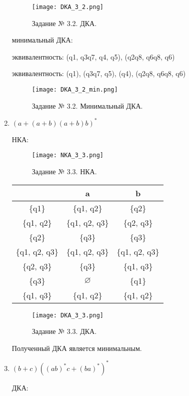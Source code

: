 \documentclass[a4paper, 12pt]{article}
\begin{document}
\begin{enumerate}
\begin{figure}[h!]
\centering
\texttt{[image: DKA\_3\_2.png]}
\caption{Задание № 3.2. ДКА.}
\end{figure}

 минимальный ДКА:

 эквивалентность: (q1, q3q7, q4, q5), (q2q8, q6q8, q6)

 эквивалентность: (q1), (q3q7, q5), (q4), (q2q8, q6q8, q6)

\begin{figure}[h!]
\centering
\texttt{[image: DKA\_3\_2\_min.png]}
\caption{Задание № 3.2. Минимальный ДКА.}
\end{figure}

\item $ (a+(a+b)(a+b)b)^* $ 

 НКА:

\begin{figure}[h!]
\centering
\texttt{[image: NKA\_3\_3.png]}
\caption{Задание № 3.3. НКА.}
\end{figure}

\begin{center}
\begin{tabular}{ |c|c|c| } 
\hline
\, & a & b \\
\hline
 \{q1\} & \{q1, q2\} & \{q2\} \\
\hline
 \{q1, q2\} & \{q1, q2, q3\} & \{q2, q3\} \\
\hline
 \{q2\} & \{q3\} & \{q3\} \\
\hline
 \{q1, q2, q3\} & \{q1, q2, q3\} & \{q1, q2, q3\} \\
\hline
 \{q2, q3\} & \{q3\} & \{q1, q3\} \\
\hline
 \{q3\} & $\varnothing$ & \{q1\} \\
\hline
 \{q1, q3\} & \{q1, q2\} & \{q1, q2\} \\
\hline
\end{tabular}
\end{center}

\begin{figure}[h!]
\centering
\texttt{[image: DKA\_3\_3.png]}
\caption{Задание № 3.3. ДКА.}
\end{figure}

Полученный ДКА является минимальным.

\item $ (b+c)((ab)^*c+(ba)^*)^* $ 

 ДКА:


\end{enumerate}
\end{document}
